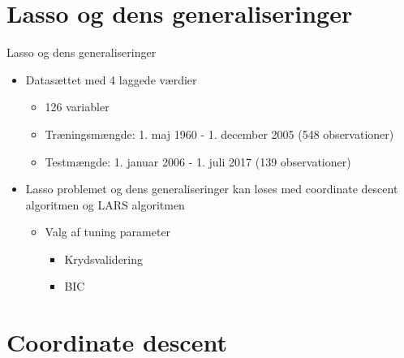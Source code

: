\section{Lasso og dens generaliseringer}
\begin{frame}{Lasso og dens generaliseringer}
\begin{itemize}
\item Datasættet med 4 laggede værdier
\begin{itemize}
\item 126 variabler
\item Træningsmængde: 1. maj 1960 - 1. december 2005 (548 observationer)
\item Testmængde: 1. januar 2006 - 1. juli 2017 (139 observationer)
\end{itemize}
\item Lasso problemet og dens generaliseringer kan løses med coordinate descent algoritmen og LARS algoritmen
\begin{itemize}
\item Valg af tuning parameter
\begin{itemize}
\item Krydsvalidering
\item BIC
\end{itemize}
\end{itemize}
\end{itemize}
\end{frame}

\section{Coordinate descent}

